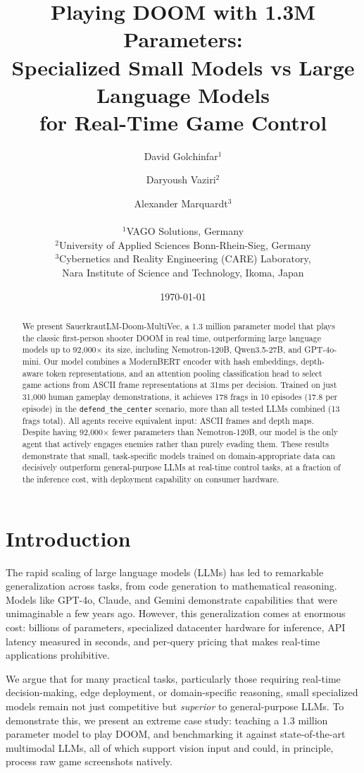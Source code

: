 \documentclass[11pt,a4paper]{article}
\title{%
  \textbf{Playing DOOM with 1.3M Parameters:\\Specialized Small Models vs Large Language Models\\for Real-Time Game Control}
}
\author{
  David Golchinfar$^{1}$ \and Daryoush Vaziri$^{2}$ \and Alexander Marquardt$^{3}$ \\\\
  $^{1}$VAGO Solutions, Germany \\
  $^{2}$University of Applied Sciences Bonn-Rhein-Sieg, Germany \\
  $^{3}$Cybernetics and Reality Engineering (CARE) Laboratory, \\
  Nara Institute of Science and Technology, Ikoma, Japan
}
\date{\today}
\begin{document}
\maketitle

\begin{abstract}
We present SauerkrautLM-Doom-MultiVec, a 1.3 million parameter model that plays the classic first-person shooter DOOM in real time, outperforming large language models up to 92,000$\times$ its size, including Nemotron-120B, Qwen3.5-27B, and GPT-4o-mini. Our model combines a ModernBERT encoder with hash embeddings, depth-aware token representations, and an attention pooling classification head to select game actions from ASCII frame representations at 31ms per decision. Trained on just 31,000 human gameplay demonstrations, it achieves 178 frags in 10 episodes (17.8 per episode) in the \texttt{defend\_the\_center} scenario, more than all tested LLMs combined (13 frags total). All agents receive equivalent input: ASCII frames and depth maps. Despite having 92,000$\times$ fewer parameters than Nemotron-120B, our model is the only agent that actively engages enemies rather than purely evading them. These results demonstrate that small, task-specific models trained on domain-appropriate data can decisively outperform general-purpose LLMs at real-time control tasks, at a fraction of the inference cost, with deployment capability on consumer hardware.
\end{abstract}

\section{Introduction}
\label{sec:intro}

The rapid scaling of large language models (LLMs) has led to remarkable generalization across tasks, from code generation to mathematical reasoning. Models like GPT-4o, Claude, and Gemini demonstrate capabilities that were unimaginable a few years ago. However, this generalization comes at enormous cost: billions of parameters, specialized datacenter hardware for inference, API latency measured in seconds, and per-query pricing that makes real-time applications prohibitive.

We argue that for many practical tasks, particularly those requiring real-time decision-making, edge deployment, or domain-specific reasoning, small specialized models remain not just competitive but \textit{superior} to general-purpose LLMs. To demonstrate this, we present an extreme case study: teaching a 1.3 million parameter model to play DOOM, and benchmarking it against state-of-the-art multimodal LLMs, all of which support vision input and could, in principle, process raw game screenshots natively.
\end{document}
